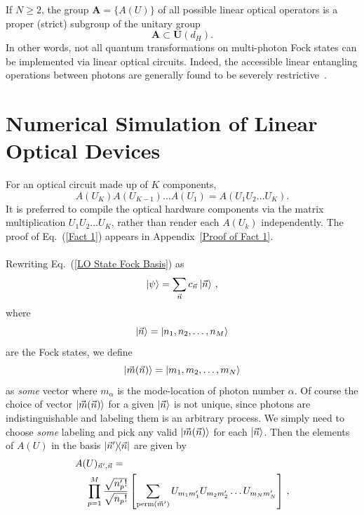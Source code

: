 \documentclass[aps,pra,twocolumn,showpacs,superscriptaddress,floatfix,10pt]{revtex4}
\begin{document}
If $N \ge 2$, the group $\textbf{A}=\{ A(U) \}$  of all possible linear optical operators is a proper (strict) subgroup of the unitary group
\begin{equation}
\label{Proper Subgroup}
\textbf{A} \subset \textbf{U}(d_H).
\end{equation}
In other words, not all quantum transformations on multi-photon Fock states can be implemented via linear optical circuits. Indeed, the accessible linear entangling operations between photons are generally found to be severely restrictive~\cite{Matt Smith,Braunstein,Jake Smith,Lougovski,Lutkenhaus,Carollo,Pavicic}. 
\section{Numerical Simulation of Linear Optical Devices}
\label{Section on Protocol}
For an optical circuit made up of $K$ components,
\begin{equation}
	\label{Fact 1}
A(U_K) A(U_{K-1}) \dots A(U_1) = A(U_1 U_2 \dots U_K).
\end{equation}
It is preferred to compile the optical hardware components via the matrix multiplication $U_1 U_2 \dots U_K$, rather than render each $A(U_k)$ independently. The proof of Eq.~(\ref{Fact 1}) appears in Appendix~\ref{Proof of Fact 1}.
\\ \\ \indent
Rewriting Eq.~(\ref{LO State Fock Basis}) as
\begin{equation}
\label{LO State Fock Vec Basis}
\ket{\psi} = \sum_{\vec{n}} c_{\vec{n}} \ket{\vec{n}} \,,
\end{equation}
where
\begin{equation}
\ket{\vec{n}} = \ket{n_1,n_2,\dots,n_M}
\end{equation}
are the Fock states, we define
\begin{equation}
\label{m definition}
\ket{\vec{m}(\vec{n})} = \ket{m_1,m_2,\dots,m_N}
\end{equation}
as \textit{some} vector where $m_\alpha$ is the mode-location of photon number $\alpha$. Of course the choice of vector $\ket{\vec{m}(\vec{n})}$ for a given $\ket{\vec{n}}$ is not unique, since photons are indistinguishable and labeling them is an arbitrary process. We simply need to choose \textit{some} labeling and pick any valid $\ket{\vec{m}(\vec{n})}$ for each $\ket{\vec{n}}$. Then the elements of $A(U)$ in the basis $\outerproduct{\vec{n}^\prime}{\vec{n}}$ are given by
\begin{eqnarray}
\label{Fact 2}
A(U)_{\vec{n}^\prime,\vec{n}} = \quad \quad \quad \quad \quad \quad \quad \quad \quad \quad \quad \quad \quad \quad \quad \quad \quad \\ \small \nonumber \prod_{p=1}^{M} \frac{\sqrt{n_p^\prime !}}{\sqrt{n_p !}} \left[\sum_{\textrm{perm}(\vec{m}^\prime)} U_{m_1 m_1^\prime} U_{m_2 m_2^\prime} \dots U_{m_N m_N^\prime} \right] \,,
\end{eqnarray}
\end{document}

